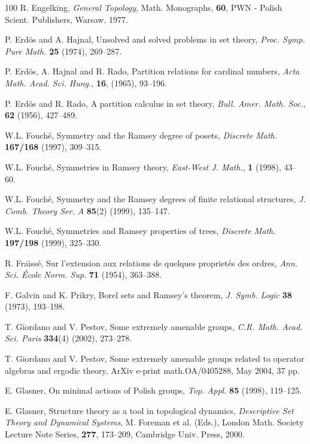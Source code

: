 \begin{thebibliography}{100}
R. Engelking, {\it General Topology}, Math. Monographs, {\bf 60},
PWN - Polish Scient. Publishers, Warsaw, 1977.

P. Erd\"{o}s and A. Hajnal,
Unsolved and solved problems in set theory,
{\it Proc. Symp. Pure Math.} {\bf 25} (1974), 269--287.

P. Erd\"{o}s, A. Hajnal and R. Rado, Partition relations for cardinal numbers, {\it Acta Math. Acad. Sci. Hung.}, {\bf 16}, (1965), 93--196.

P. Erd\"{o}s and R. Rado, A partition calculus in set theory, {\it Bull. Amer. Math. Soc.}, {\bf 62} (1956), 427--489.

W.L. Fouch\'{e}, Symmetry and the Ramsey degree of posets, {\it Discrete Math.}
{\bf 167/168} (1997), 309--315.

W.L. Fouch\'{e}, Symmetries in Ramsey theory, {\it East-West J.
Math.}, {\bf 1} (1998), 43--60.

W.L. Fouch\'{e}, Symmetry and the Ramsey degrees of finite relational
structures, {\it J. Comb. Theory Ser. A} {\bf 85}(2) (1999), 135--147.

W.L. Fouch\'{e}, Symmetries and Ramsey properties of trees, {\it
Discrete Math.} {\bf 197/198} (1999), 325--330.

R. Fra\"{\i}ss\'{e}, Sur l'extension aux relations de quelques propriet\'es
des ordres, {\it Ann. Sci. \'Ecole Norm. Sup.} {\bf 71} (1954), 363--388.

 F. Galvin and K. Prikry,
Borel sets and Ramsey's theorem, {\it J. Symb. Logic} {\bf 38} (1973),
193--198.

T. Giordano and V. Pestov, Some extremely amenable groups, {\it C.R. Math.
Acad. Sci. Paris} {\bf 334}(4) (2002), 273--278.

T. Giordano and V. Pestov, Some extremely amenable groups related to
operator algebras and ergodic theory, ArXiv e-print math.OA/0405288,
May 2004, 37 pp.

E. Glasner, On minimal actions of Polish groups, {\it Top. Appl.}
{\bf 85} (1998), 119--125.

E. Glasner, Structure theory as a tool in topological dynamics, {\it Descriptive
Set Theory and Dynamical Systems}, M. Foreman et al. (Eds.), London Math.
Society Lecture Note Series, {\bf 277}, 173--209, Cambridge Univ. Press, 2000.


\end{thebibliography}
